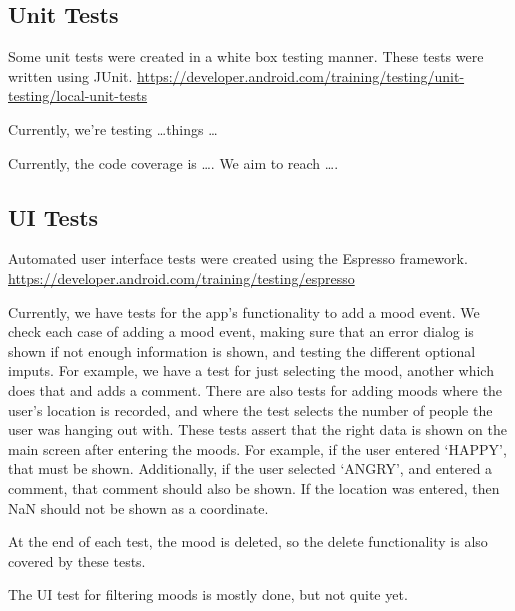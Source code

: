\subsection{Unit Tests}
Some unit tests were created in a white box testing manner.
These tests were written using JUnit. 
\url{https://developer.android.com/training/testing/unit-testing/local-unit-tests}

Currently, we're testing \dots things \dots

Currently, the code coverage is \dots. We aim to reach \dots.

\lipsum[0]


\subsection{UI Tests}
Automated user interface tests were created using the Espresso framework.
\url{https://developer.android.com/training/testing/espresso}

Currently, we have tests for the app's functionality to add a mood event.
We check each case of adding a mood event, making sure that an error 
dialog is shown if not enough information is shown, and testing the
different optional imputs. For example, we have a test for just selecting
the mood, another which does that and adds a comment. There are also tests
for adding moods where the user's location is recorded, and where the test
selects the number of people the user was hanging out with.
These tests assert that the right data is shown on the main screen
after entering the moods. For example, if the user entered `HAPPY', that
must be shown. Additionally, if the user selected `ANGRY', and entered
a comment, that comment should also be shown. If the location was entered,
then NaN should not be shown as a coordinate.

At the end of each test, the mood is deleted, so the delete functionality
is also covered by these tests.

The UI test for filtering moods is mostly done, but not quite yet.



